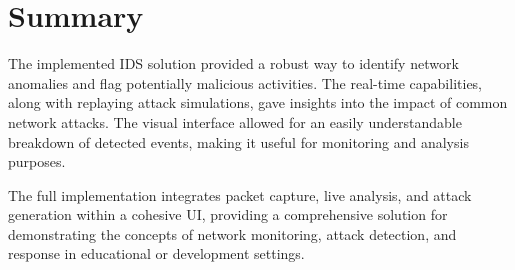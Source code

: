 \documentclass{article}
\begin{document}
\section{Summary}

The implemented IDS solution provided a robust way to identify network anomalies and flag potentially malicious activities. The real-time capabilities, along with replaying attack simulations, gave insights into the impact of common network attacks. The visual interface allowed for an easily understandable breakdown of detected events, making it useful for monitoring and analysis purposes.

The full implementation integrates packet capture, live analysis, and attack generation within a cohesive UI, providing a comprehensive solution for demonstrating the concepts of network monitoring, attack detection, and response in educational or development settings.
\end{document}
